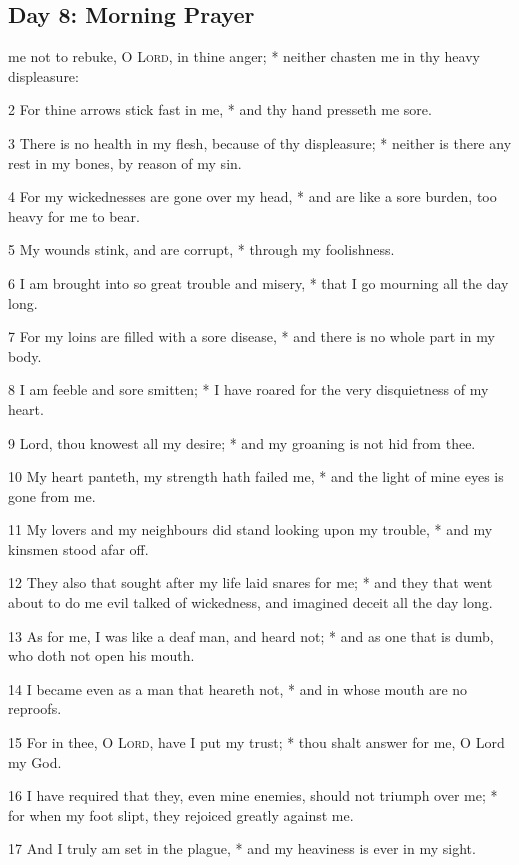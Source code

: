 \subsection{Day 8: Morning Prayer}
 me not to rebuke, O {\textsc{Lord}}, in thine anger; * neither chasten me in thy heavy displeasure:\par
2 For thine arrows stick fast in me, * and thy hand presseth me sore.\par
3 There is no health in my flesh, because of thy displeasure; * neither is there any rest in my bones, by reason of my sin.\par
4 For my wickednesses are gone over my head, * and are like a sore burden, too heavy for me to bear.\par
5 My wounds stink, and are corrupt, * through my foolishness.\par
6 I am brought into so great trouble and misery, * that I go mourning all the day long.\par
7 For my loins are filled with a sore disease, * and there is no whole part in my body.\par
8 I am feeble and sore smitten; * I have roared for the very disquietness of my heart.\par
9 Lord, thou knowest all my desire; * and my groaning is not hid from thee.\par
10 My heart panteth, my strength hath failed me, * and the light of mine eyes is gone from me.\par
11 My lovers and my neighbours did stand looking upon my trouble, * and my kinsmen stood afar off.\par
12 They also that sought after my life laid snares for me; * and they that went about to do me evil talked of wickedness, and imagined deceit all the day long.\par
13 As for me, I was like a deaf man, and heard not; * and as one that is dumb, who doth not open his mouth.\par
14 I became even as a man that heareth not, * and in whose mouth are no reproofs.\par
15 For in thee, O {\textsc{Lord}}, have I put my trust; * thou shalt answer for me, O Lord my God.\par
16 I have required that they, even mine enemies, should not triumph over me; * for when my foot slipt, they rejoiced greatly against me.\par
17 And I truly am set in the plague, * and my heaviness is ever in my sight.\par
